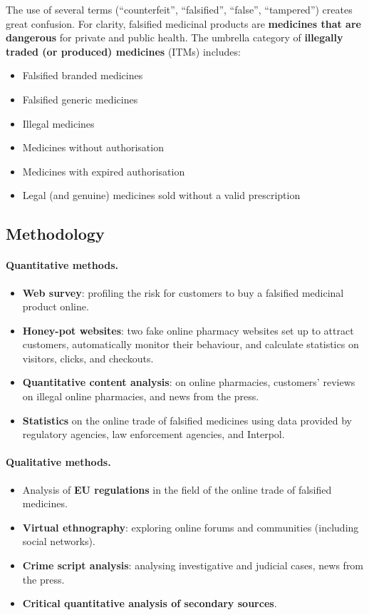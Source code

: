 \documentclass[11pt,a4paper,openany]{report}
\theoremstyle{definition}
\theoremstyle{plain}
\theoremstyle{remark}
\begin{document}
The use of several terms (``counterfeit'', ``falsified'', ``false'', ``tampered'') creates great confusion. For clarity, falsified medicinal products are \textbf{medicines that are dangerous} for private and public health. The umbrella category of \textbf{illegally traded (or produced) medicines} (ITMs) includes:

\begin{itemize}
    \item Falsified branded medicines
    \item Falsified generic medicines
    \item Illegal medicines
    \item Medicines without authorisation
    \item Medicines with expired authorisation
    \item Legal (and genuine) medicines sold without a valid prescription
\end{itemize}

\subsection{Methodology}

\paragraph{Quantitative methods.}
\begin{itemize}
    \item \textbf{Web survey}: profiling the risk for customers to buy a falsified medicinal product online.
    \item \textbf{Honey-pot websites}: two fake online pharmacy websites set up to attract customers, automatically monitor their behaviour, and calculate statistics on visitors, clicks, and checkouts.
    \item \textbf{Quantitative content analysis}: on online pharmacies, customers' reviews on illegal online pharmacies, and news from the press.
    \item \textbf{Statistics} on the online trade of falsified medicines using data provided by regulatory agencies, law enforcement agencies, and Interpol.
\end{itemize}

\paragraph{Qualitative methods.}
\begin{itemize}
    \item Analysis of \textbf{EU regulations} in the field of the online trade of falsified medicines.
    \item \textbf{Virtual ethnography}: exploring online forums and communities (including social networks).
    \item \textbf{Crime script analysis}: analysing investigative and judicial cases, news from the press.
    \item \textbf{Critical quantitative analysis of secondary sources}.
\end{itemize}
\end{document}
